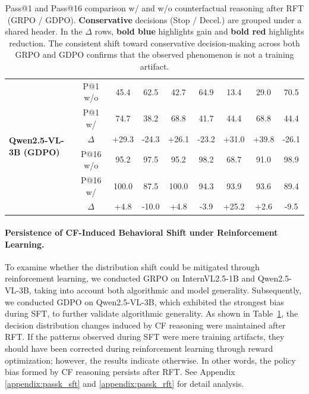 \documentclass{article}
\begin{document}
\begin{table}[h]
{\begin{tabular}{l c | cc cc | ccc}
\multirow{6}{*}{\textbf{Qwen2.5-VL-3B (GDPO)}}
 & P@1 w/o & 45.4 & 62.5 & 42.7 & 64.9 & 13.4 & 29.0 & 70.5 \\
 & P@1 w/  & 74.7 & 38.2 & 68.8 & 41.7 & 44.4 & 68.8 & 44.4 \\
 & $\Delta$
   & \cellcolor{blue!15}+29.3 & \cellcolor{red!15}-24.3
   & \cellcolor{blue!15}+26.1 & \cellcolor{red!15}-23.2
   & \cellcolor{blue!15}+31.0 & \cellcolor{blue!15}+39.8
   & \cellcolor{red!15}-26.1 \\
\cmidrule{2-9}
 & P@16 w/o & 95.2 & 97.5 & 95.2 & 98.2 & 68.7 & 91.0 & 98.9 \\
 & P@16 w/  & 100.0 & 87.5 & 100.0 & 94.3 & 93.9 & 93.6 & 89.4 \\
 & $\Delta$
   & \cellcolor{blue!15}+4.8  & \cellcolor{red!15}-10.0
   & \cellcolor{blue!15}+4.8  & \cellcolor{red!15}-3.9
   & \cellcolor{blue!15}+25.2 & \cellcolor{blue!15}+2.6
   & \cellcolor{red!15}-9.5 \\
\bottomrule
\end{tabular}
}
\caption{
  Pass@1 and Pass@16 comparison w/ and w/o counterfactual reasoning after RFT (GRPO / GDPO).
  \textbf{Conservative} decisions (Stop / Decel.) are grouped under a shared header.
  In the $\Delta$ rows, \colorbox{blue!15}{\textbf{bold blue}} highlights gain
  and \colorbox{red!15}{\textbf{bold red}} highlights reduction.
  The consistent shift toward conservative decision-making across both GRPO and GDPO
  confirms that the observed phenomenon is not a training artifact.
}
\label{tab:passk_rft}
\end{table}

\paragraph{Persistence of CF-Induced Behavioral Shift under Reinforcement Learning.} To examine whether the distribution shift could be mitigated through reinforcement learning, we conducted GRPO on InternVL2.5-1B and Qwen2.5-VL-3B, taking into account both algorithmic and model generality. Subsequently, we conducted GDPO on Qwen2.5-VL-3B, which exhibited the strongest bias during SFT, to further validate algorithmic generality. As shown in Table~\ref{tab:passk_rft}, the decision distribution changes induced by CF reasoning were maintained after RFT. If the patterns observed during SFT were mere training artifacts, they should have been corrected during reinforcement learning through reward optimization; however, the results indicate otherwise. In other words, the policy bias formed by CF reasoning persists after RFT. See Appendix \ref{appendix:passk_sft} and \ref{appendix:passk_rft} for detail analysis.
\end{document}
